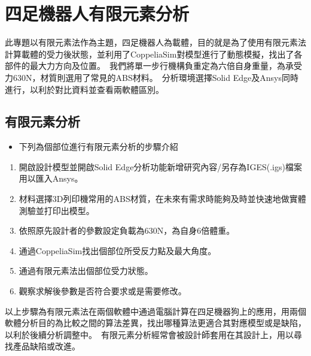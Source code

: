 \chapter{四足機器人有限元素分析}

此專題以有限元素法作為主題，四足機器人為載體，目的就是為了使用有限元素法計算載體的受力後狀態，並利用了CoppeliaSim對模型進行了動態模擬，找出了各部件的最大力方向及位置。\
我們將單一步行機構負重定為六倍自身重量，為承受力630N，材質則選用了常見的ABS材料。\
分析環境選擇Solid Edge及Ansys同時進行，以利於對比資料並查看兩軟體區別。\\

\section{有限元素分析}
\begin{itemize}
\item 下列為個部位進行有限元素分析的步驟介紹
\end{itemize}
\begin{enumerate}
\item 開啟設計模型並開啟Solid Edge分析功能新增研究內容/另存為IGES(.igs)檔案用以匯入Ansys。
\item 材料選擇3D列印機常用的ABS材質，在未來有需求時能夠及時並快速地做實體測驗並打印出模型。
\item 依照原先設計者的參數設定負載為630N，為自身6倍體重。
\item 通過CoppeliaSim找出個部位所受反力點及最大角度。
\item 通過有限元素法出個部位受力狀態。
\item 觀察求解後參數是否符合要求或是需要修改。
\end{enumerate}
以上步驟為有限元素法在兩個軟體中通過電腦計算在四足機器狗上的應用，用兩個軟體分析目的為比較之間的算法差異，找出哪種算法更適合其對應模型或是缺陷，以利於後續分析調整中。\
有限元素分析經常會被設計師套用在其設計上，用以尋找產品缺陷或改進。\
\newpage
